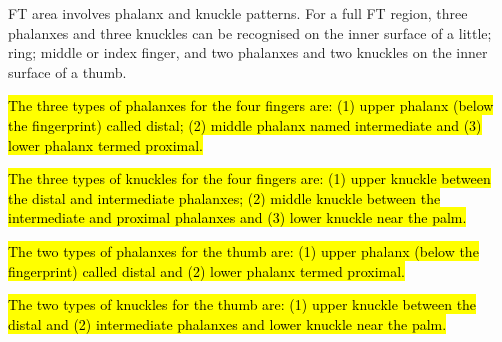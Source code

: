 \documentclass[review]{elsarticle}
\begin{document}
	FT area involves phalanx and knuckle patterns. For a full FT region, three phalanxes and three knuckles can be recognised on the inner surface of a little; ring; middle or index finger, and two phalanxes and two knuckles on the inner surface of a thumb. 
	
	\hl{The three types of phalanxes for the four fingers are: (1) upper phalanx (below the fingerprint) called distal; (2) middle phalanx named intermediate and (3) lower phalanx termed proximal.} 
	
	\hl{The three types of knuckles for the four fingers are: (1) upper knuckle between the distal and intermediate phalanxes; (2) middle knuckle between the intermediate and proximal phalanxes and (3) lower knuckle near the palm.} 
	
	\hl{The two types of phalanxes for the thumb are: (1) upper phalanx (below the fingerprint) called distal and (2) lower phalanx termed proximal.} 
	
	\hl{The two types of knuckles for the thumb are: (1) upper knuckle between the distal and (2) intermediate phalanxes and lower knuckle near the palm.} 
	
\end{document}
